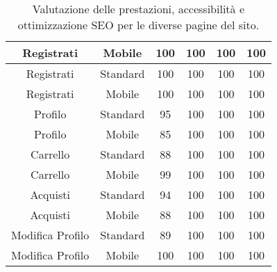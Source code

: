 \begin{table}[H]
\begin{tabular}{|c|c|c|c|c|c|}
        \rowcolor[gray]{0.9}
        Registrati & Mobile & 100 & 100 & 100 & 100 \\ 
        \hline
        Registrati & Standard & 100 & 100 & 100 & 100 \\ 
        \hline
        \rowcolor[gray]{0.9}
        Registrati & Mobile & 100 & 100 & 100 & 100 \\ 
        \hline
        Profilo & Standard & 95 & 100 & 100 & 100 \\ 
        \hline
        \rowcolor[gray]{0.9}
        Profilo & Mobile & 85 & 100 & 100 & 100 \\ 
        \hline
        Carrello & Standard & 88 & 100 & 100 & 100 \\ 
        \hline
        \rowcolor[gray]{0.9}
        Carrello & Mobile & 99 & 100 & 100 & 100 \\ 
        \hline
        Acquisti & Standard & 94 & 100 & 100 & 100 \\ 
        \hline
        \rowcolor[gray]{0.9}
        Acquisti & Mobile & 88 & 100 & 100 & 100 \\ 
        \hline
        Modifica Profilo & Standard & 89 & 100 & 100 & 100 \\ 
        \hline
        \rowcolor[gray]{0.9}
        Modifica Profilo & Mobile & 100 & 100 & 100 & 100 \\ 
        \hline
    \end{tabular}
    \caption{Valutazione delle prestazioni, accessibilità e ottimizzazione SEO per le diverse pagine del sito.}
    \label{tab:prestazioni}
\end{table}
